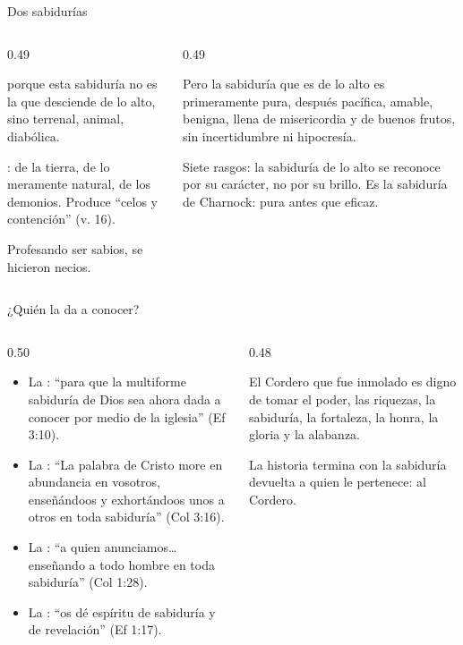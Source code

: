 \begin{frame}{Dos sabidurías}
\begin{columns}[t,onlytextwidth]
\begin{column}{0.49\textwidth}
\begin{cita}porque esta sabiduría no es la que desciende de lo alto, sino terrenal, animal, diabólica.\end{cita}
\scriptsize{}: de la tierra, de lo meramente natural, de los demonios. Produce ``celos y contención'' (v. 16).\par\medskip
\begin{cita}Profesando ser sabios, se hicieron necios.\end{cita}
\end{column}
\begin{column}{0.49\textwidth}
\begin{cita}Pero la sabiduría que es de lo alto es primeramente pura, después pacífica, amable, benigna, llena de misericordia y de buenos frutos, sin incertidumbre ni hipocresía.\end{cita}
\scriptsize Siete rasgos: la sabiduría de lo alto se reconoce por su carácter, no por su brillo. Es la sabiduría  de Charnock: pura antes que eficaz.
\end{column}
\end{columns}
\end{frame}

\begin{frame}{¿Quién la da a conocer?}
\begin{columns}[t,onlytextwidth]
\begin{column}{0.50\textwidth}\small
\begin{itemize}
\item La : ``para que la multiforme sabiduría de Dios sea ahora dada a conocer por medio de la iglesia'' (Ef 3:10).
\item La : ``La palabra de Cristo more en abundancia en vosotros, enseñándoos y exhortándoos unos a otros en toda sabiduría'' (Col 3:16).
\item La : ``a quien anunciamos\ldots{} enseñando a todo hombre en toda sabiduría'' (Col 1:28).
\item La : ``os dé espíritu de sabiduría y de revelación'' (Ef 1:17).
\end{itemize}
\end{column}
\begin{column}{0.48\textwidth}
\begin{cita}El Cordero que fue inmolado es digno de tomar el poder, las riquezas, la sabiduría, la fortaleza, la honra, la gloria y la alabanza.\end{cita}
\small La historia termina con la sabiduría devuelta a quien le pertenece: al Cordero.
\end{column}
\end{columns}
\end{frame}


